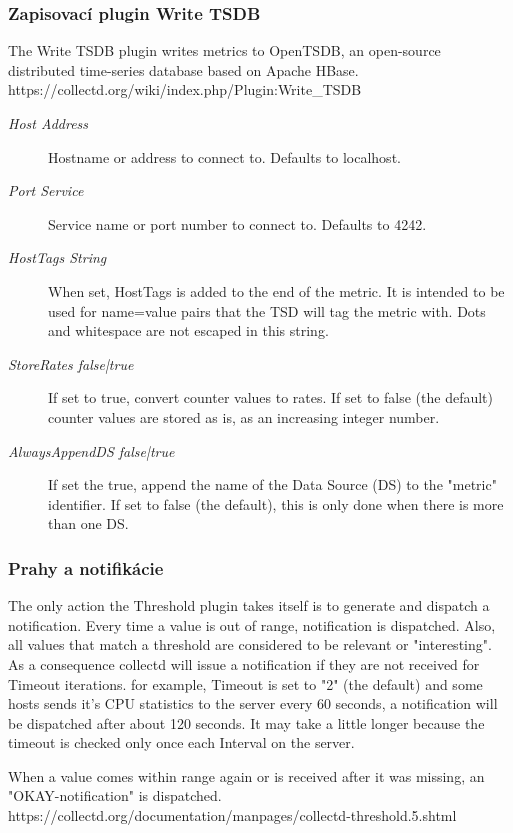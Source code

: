 \documentclass[11pt,final,oneside]{fithesis}
\begin{document}
\subsubsection{Zapisovací plugin Write TSDB}
The Write TSDB plugin writes metrics to OpenTSDB, an open-source distributed time-series database based on Apache HBase.
https://collectd.org/wiki/index.php/Plugin:Write_TSDB

\begin{description}
\item[\emph{Host Address}] Hostname or address to connect to. Defaults to localhost.
\item[\emph{Port Service}] Service name or port number to connect to. Defaults to 4242.
\item[\emph{HostTags String}] When set, HostTags is added to the end of the metric. It is intended to be used for name=value pairs that the TSD will tag the metric with. Dots and whitespace are not escaped in this string.
\item[\emph{StoreRates false|true}] If set to true, convert counter values to rates. If set to false (the default) counter values are stored as is, as an increasing integer number.
\item[\emph{AlwaysAppendDS false|true}] If set the true, append the name of the Data Source (DS) to the "metric" identifier. If set to false (the default), this is only done when there is more than one DS.
\end{description}

\subsubsection{Prahy a notifikácie}

The only action the Threshold plugin takes itself is to generate and dispatch a notification. Every time a value is out of range, 
notification is dispatched. 
Also, all values that match a threshold are considered to be relevant or "interesting". As a consequence collectd will issue a notification 
if they are not received for Timeout iterations.  for example, Timeout is set to "2" (the default) and some hosts sends it's CPU statistics to the server every 60 seconds, a notification will be dispatched after about 120 seconds. It may take a little longer because the timeout is checked only once each Interval on the server.

When a value comes within range again or is received after it was missing, an "OKAY-notification" is dispatched.
https://collectd.org/documentation/manpages/collectd-threshold.5.shtml
\end{document}
